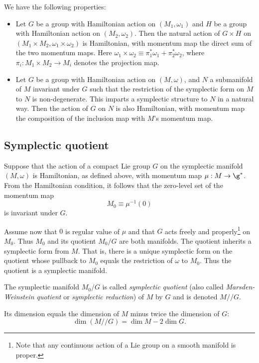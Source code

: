 \documentclass{worksheetclass}
\begin{document}
        \begin{prop}
            We have the following properties:
            \begin{itemize}
                \item Let $G$ be a group with Hamiltonian action on $(M_1,\omega_1)$ and $H$ be a group with Hamiltonian action on $(M_2,\omega_2)$. Then the natural action of $G\times H$ on $(M_{1}\times M_{2},\omega _{1}\times \omega _{2})$ is Hamiltonian, with momentum map the direct sum of the two momentum maps. Here $\omega _{1}\times \omega _{2}\equiv\pi _{1}^{*}\omega _{1}+\pi _{2}^{*}\omega _{2}$, where $\pi_i : M_1 \times M_2 \rightarrow M_i$ denotes the projection map.
                \item Let $G$ be a group with Hamiltonian action on $(M,\omega)$, and $N$ a submanifold of $M$ invariant under $G$ such that the restriction of the symplectic form on $M$ to $N$ is non-degenerate. This imparts a symplectic structure to $N$ in a natural way. Then the action of $G$ on $N$ is also Hamiltonian, with momentum map the composition of the inclusion map with $M$'s momentum map.
            \end{itemize}
        \end{prop}

    \subsection{Symplectic quotient}\label{sec:symplecticquotient}

        Suppose that the action of a compact Lie group $G$ on the symplectic manifold $(M,\omega)$ is Hamiltonian, as defined above, with momentum map $\mu:M\to\g^*$. From the Hamiltonian condition, it follows that the zero-level set of the momentum map
        \begin{equation}
            M_0\equiv\mu^{-1}(0)
        \end{equation}
        is invariant under $G$.

        Assume now that $0$ is regular value of $\mu$ and that $G$ acts freely and properly\footnote{Note that any continuous action of a Lie group on a smooth manifold is proper.} on $M_0$. Thus $M_0$ and its quotient $M_0/G$ are both manifolds. The quotient inherits a symplectic form from $M$. That is, there is a unique symplectic form on the quotient whose pullback to $M_0$ equals the restriction of $\omega$ to $M_0$. Thus the quotient is a symplectic manifold.

        \begin{defn}
            The symplectic manifold $M_0/G$ is called \emph{symplectic quotient} (also called \emph{Marsden-Weinstein quotient} or \emph{symplectic reduction}) of $M$ by $G$ and is denoted $M//G$\index{$//$}.
        \end{defn}
        Its dimension equals the dimension of $M$ minus twice the dimension of $G$:
        \begin{equation}
            \dim(M//G)=\dim M-2\dim G.
        \end{equation}
\end{document}
